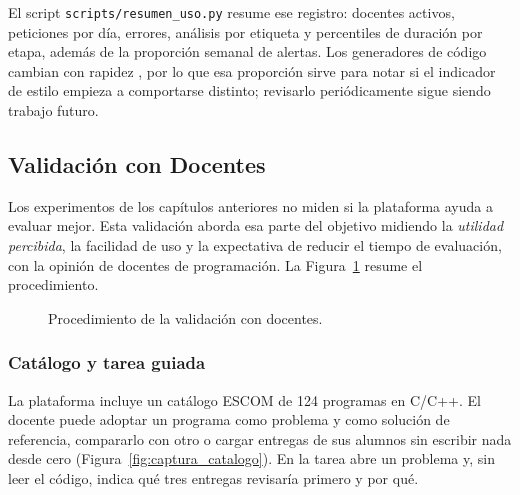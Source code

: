 El script \texttt{scripts/resumen\_uso.py} resume ese registro: docentes activos, peticiones por día, errores, análisis por etiqueta y percentiles de duración por etapa, además de la proporción semanal de alertas. Los generadores de código cambian con rapidez \cite{Gama2014ConceptDrift}, por lo que esa proporción sirve para notar si el indicador de estilo empieza a comportarse distinto; revisarlo periódicamente sigue siendo trabajo futuro.

\subsection{Validación con Docentes}
\label{subsec:validacion_docentes}

Los experimentos de los capítulos anteriores no miden si la plataforma ayuda a evaluar mejor. Esta validación aborda esa parte del objetivo midiendo la \emph{utilidad percibida}, la facilidad de uso y la expectativa de reducir el tiempo de evaluación, con la opinión de docentes de programación. La Figura~\ref{fig:validacion} resume el procedimiento.

\begin{figure}[H]
    \centering
    \caption{Procedimiento de la validación con docentes.}
    \label{fig:validacion}
\end{figure}

\subsubsection{Catálogo y tarea guiada}
La plataforma incluye un catálogo ESCOM de 124 programas en C/C++. El docente puede adoptar un programa como problema y como solución de referencia, compararlo con otro o cargar entregas de sus alumnos sin escribir nada desde cero (Figura~\ref{fig:captura_catalogo}). En la tarea abre un problema y, sin leer el código, indica qué tres entregas revisaría primero y por qué.

